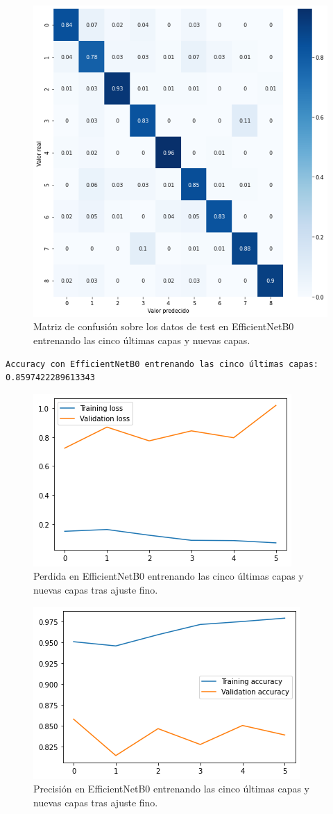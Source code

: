 \begin{figure}[H]
  \centering
  \includegraphics[width=0.5\linewidth]{Imagenes/entrenamiento_redes/5-ult/efficientnet_5ult_matriz.png}
  \caption{Matriz de confusión sobre los datos de test en EfficientNetB0 entrenando las cinco últimas capas y nuevas capas.}
\end{figure}


\begin{lstlisting}
Accuracy con EfficientNetB0 entrenando las cinco últimas capas: 0.8597422289613343
\end{lstlisting}


\begin{figure}[H]
  \centering
  \includegraphics[width=0.5\linewidth]{Imagenes/entrenamiento_redes/5-ult/efficientnet_5fine_loss.png}
  \caption{Perdida en EfficientNetB0 entrenando las cinco últimas capas y nuevas capas tras ajuste fino.}
\end{figure}

\begin{figure}[H]
  \centering
  \includegraphics[width=0.5\linewidth]{Imagenes/entrenamiento_redes/5-ult/efficientnet_5fine_acc.png}
  \caption{Precisión en EfficientNetB0 entrenando las cinco últimas capas y nuevas capas tras ajuste fino.}
\end{figure}

